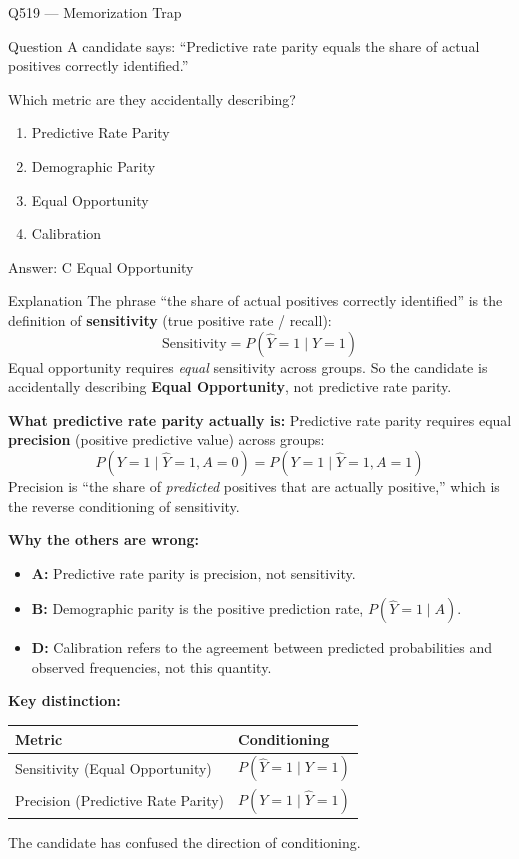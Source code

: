 \documentclass[aspectratio=169,8pt]{beamer}
\begin{document}
\begin{frame}{Q519 --- Memorization Trap}
	\begin{block}{Question}
		A candidate says:
		``Predictive rate parity equals the share of actual positives correctly identified.''
		
		Which metric are they accidentally describing?
		\begin{enumerate}
			\item Predictive Rate Parity
			\item Demographic Parity
			\item Equal Opportunity
			\item Calibration
		\end{enumerate}
	\end{block}
	\begin{exampleblock}{Answer: C}
		Equal Opportunity
	\end{exampleblock}
	\begin{block}{Explanation}
		The phrase ``the share of actual positives correctly identified'' is the
		definition of \textbf{sensitivity} (true positive rate / recall):
		\[
		\text{Sensitivity} = P(\hat{Y} = 1 \mid Y = 1)
		\]
		Equal opportunity requires \emph{equal} sensitivity across groups.
		So the candidate is accidentally describing \textbf{Equal Opportunity},
		not predictive rate parity.
		
		\textbf{What predictive rate parity actually is:}
		Predictive rate parity requires equal \textbf{precision} (positive predictive
		value) across groups:
		\[
		P(Y = 1 \mid \hat{Y} = 1, A = 0) = P(Y = 1 \mid \hat{Y} = 1, A = 1)
		\]
		Precision is ``the share of \emph{predicted} positives that are actually positive,''
		which is the reverse conditioning of sensitivity.
		
		\textbf{Why the others are wrong:}
		\begin{itemize}
			\item \textbf{A:} Predictive rate parity is precision, not sensitivity.
			\item \textbf{B:} Demographic parity is the positive prediction rate,
			\(P(\hat{Y} = 1 \mid A)\).
			\item \textbf{D:} Calibration refers to the agreement between predicted
			probabilities and observed frequencies, not this quantity.
		\end{itemize}
		\textbf{Key distinction:}
		\begin{center}
			\begin{tabular}{ll}
				\textbf{Metric} & \textbf{Conditioning} \\
				\hline
				Sensitivity (Equal Opportunity) & \(P(\hat{Y}=1 \mid Y=1)\) \\
				Precision (Predictive Rate Parity) & \(P(Y=1 \mid \hat{Y}=1)\) \\
			\end{tabular}
		\end{center}
		The candidate has confused the direction of conditioning.
	\end{block}
\end{frame}
\end{document}
